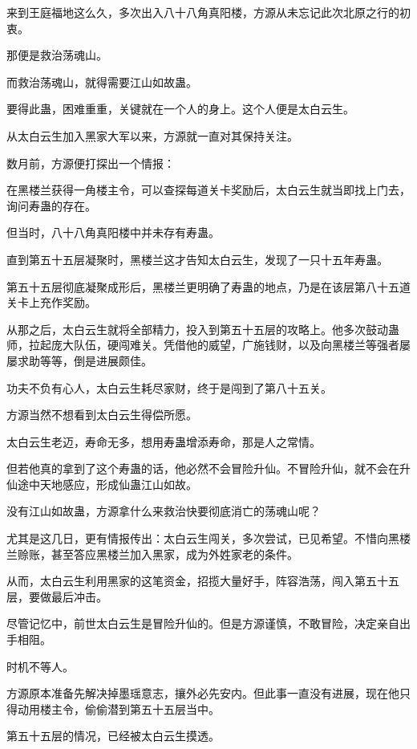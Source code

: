 
\begin{this_body}

来到王庭福地这么久，多次出入八十八角真阳楼，方源从未忘记此次北原之行的初衷。

那便是救治荡魂山。

而救治荡魂山，就得需要江山如故蛊。

要得此蛊，困难重重，关键就在一个人的身上。这个人便是太白云生。

从太白云生加入黑家大军以来，方源就一直对其保持关注。

数月前，方源便打探出一个情报：

在黑楼兰获得一角楼主令，可以查探每道关卡奖励后，太白云生就当即找上门去，询问寿蛊的存在。

但当时，八十八角真阳楼中并未存有寿蛊。

直到第五十五层凝聚时，黑楼兰这才告知太白云生，发现了一只十五年寿蛊。

第五十五层彻底凝聚成形后，黑楼兰更明确了寿蛊的地点，乃是在该层第八十五道关卡上充作奖励。

从那之后，太白云生就将全部精力，投入到第五十五层的攻略上。他多次鼓动蛊师，拉起庞大队伍，硬闯难关。凭借他的威望，广施钱财，以及向黑楼兰等强者屡屡求助等等，倒是进展颇佳。

功夫不负有心人，太白云生耗尽家财，终于是闯到了第八十五关。

方源当然不想看到太白云生得偿所愿。

太白云生老迈，寿命无多，想用寿蛊增添寿命，那是人之常情。

但若他真的拿到了这个寿蛊的话，他必然不会冒险升仙。不冒险升仙，就不会在升仙途中天地感应，形成仙蛊江山如故。

没有江山如故蛊，方源拿什么来救治快要彻底消亡的荡魂山呢？

尤其是这几日，更有情报传出：太白云生闯关，多次尝试，已见希望。不惜向黑楼兰赊账，甚至答应黑楼兰加入黑家，成为外姓家老的条件。

从而，太白云生利用黑家的这笔资金，招揽大量好手，阵容浩荡，闯入第五十五层，要做最后冲击。

尽管记忆中，前世太白云生是冒险升仙的。但是方源谨慎，不敢冒险，决定亲自出手相阻。

时机不等人。

方源原本准备先解决掉墨瑶意志，攘外必先安内。但此事一直没有进展，现在他只得动用楼主令，偷偷潜到第五十五层当中。

第五十五层的情况，已经被太白云生摸透。


\end{this_body}
